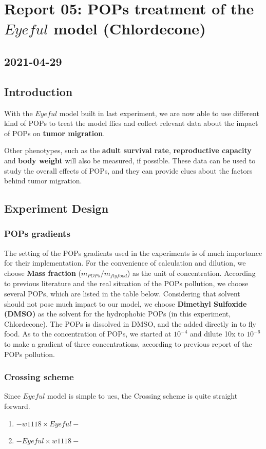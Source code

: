 \newpage
\section{Report 05: POPs treatment of the $Eyeful$ model (Chlordecone)}

\subsection*{2021-04-29}

\subsection{Introduction}

With the $Eyeful$ model built in last experiment, we are now able to use different kind of POPs to treat the model flies and collect relevant data about the impact of POPs on \textbf{tumor migration}.

Other phenotypes, such as the \textbf{adult survival rate}, \textbf{reproductive capacity} and \textbf{body weight} will also be measured, if possible. These data can be used to study the overall effects of POPs, and they can provide clues about the factors behind tumor migration.

\subsection{Experiment Design}

\subsubsection{POPs gradients}
The setting of the POPs gradients used in the experiments is of much importance for their implementation.
For the convenience of calculation and dilution, we choose \textbf{Mass fraction} ($m_{POPs}/m_{fly food}$) as the unit of concentration.
According to previous literature and the real situation of the POPs pollution, we choose several POPs, which are listed in the table below. Considering that solvent should not pose much impact to our model, we choose \textbf{Dimethyl Sulfoxide (DMSO)} as the solvent for the hydrophobic POPs (in this experiment, Chlordecone). The POPs is dissolved in DMSO, and the added directly in to fly food.
As to the concentration of POPs, we started at $10^{-4}$ and dilute 10x to $10^{-6}$ to make a gradient of three concentrations, according to previous report of the POPs pollution.


\subsubsection{Crossing scheme}
Since $Eyeful$ model is simple to ues, the Crossing scheme is quite straight forward.
\begin{enumerate}
    \item \female $ -w1118 \times Eyeful- $ \male
    \item \female $ -Eyeful \times w1118- $ \male
\end{enumerate}

